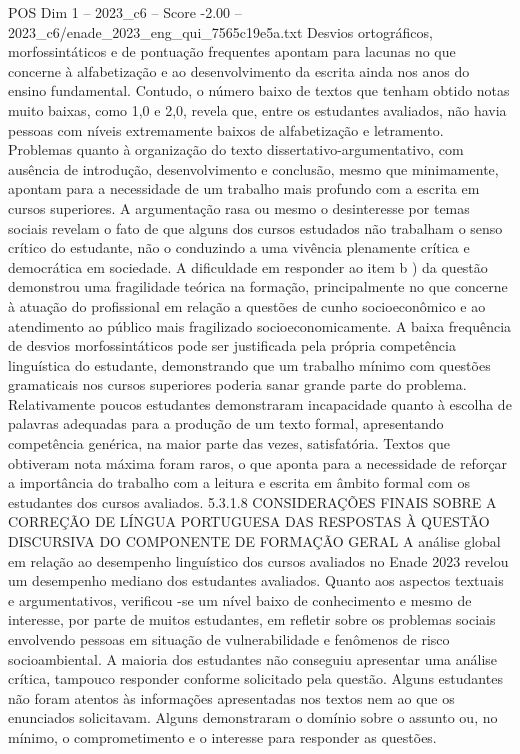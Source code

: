 \begin{textsample}{POS Dim 1 – 2023\_c6 – Score -2.00 – 2023\_c6/enade\_2023\_eng\_qui\_7565c19e5a.txt}
Desvios ortográficos, morfossintáticos e de pontuação frequentes apontam para lacunas no que concerne à alfabetização e ao desenvolvimento da escrita ainda nos anos do ensino fundamental.
Contudo, o número baixo de textos que tenham obtido notas muito baixas, como 1,0 e 2,0, revela que, entre os estudantes avaliados, não havia pessoas com níveis extremamente baixos de alfabetização e letramento.
Problemas quanto à organização do texto dissertativo-argumentativo, com ausência de introdução, desenvolvimento e conclusão, mesmo que minimamente, apontam para a necessidade de um trabalho mais profundo com a escrita em cursos superiores.
A argumentação rasa ou mesmo o desinteresse por temas sociais revelam o fato de que alguns dos cursos estudados não trabalham o senso crítico do estudante, não o conduzindo a uma vivência plenamente crítica e democrática em sociedade.
A dificuldade em responder ao item b ) da questão demonstrou uma fragilidade teórica na formação, principalmente no que concerne à atuação do profissional em relação a questões de cunho socioeconômico e ao atendimento ao público mais fragilizado socioeconomicamente.
A baixa frequência de desvios morfossintáticos pode ser justificada pela própria competência linguística do estudante, demonstrando que um trabalho mínimo com questões gramaticais nos cursos superiores poderia sanar grande parte do problema.
Relativamente poucos estudantes demonstraram incapacidade quanto à escolha de palavras adequadas para a produção de um texto formal, apresentando competência genérica, na maior parte das vezes, satisfatória.
Textos que obtiveram nota máxima foram raros, o que aponta para a necessidade de reforçar a importância do trabalho com a leitura e escrita em âmbito formal com os estudantes dos cursos avaliados. 5.3.1.8 CONSIDERAÇÕES FINAIS SOBRE A CORREÇÃO DE LÍNGUA PORTUGUESA DAS RESPOSTAS À QUESTÃO DISCURSIVA DO COMPONENTE DE FORMAÇÃO GERAL A análise global em relação ao desempenho linguístico dos cursos avaliados no Enade 2023 revelou um desempenho mediano dos estudantes avaliados.
Quanto aos aspectos textuais e argumentativos, verificou -se um nível baixo de conhecimento e mesmo de interesse, por parte de muitos estudantes, em refletir sobre os problemas sociais envolvendo pessoas em situação de vulnerabilidade e fenômenos de risco socioambiental.
A maioria dos estudantes não conseguiu apresentar uma análise crítica, tampouco responder conforme solicitado pela questão.
Alguns estudantes não foram atentos às informações apresentadas nos textos nem ao que os enunciados solicitavam.
Alguns demonstraram o domínio sobre o assunto ou, no mínimo, o comprometimento e o interesse para responder as questões.

\end{textsample}
